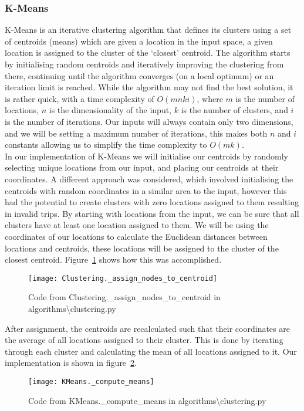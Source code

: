 \subsubsection{K-Means}\label{subsubsec:k-means}
K-Means is an iterative clustering algorithm that defines its clusters using a set of centroids (means) which are
given a location in the input space, a given location is assigned to the cluster of the `closest' centroid.
The algorithm starts by initialising random centroids and iteratively improving the clustering from there, continuing
until the algorithm converges (on a local optimum) or an iteration limit is reached.
While the algorithm may not find the best solution, it is rather quick, with a time complexity of $O(m n k i)$,
where $m$ is the number of locations, $n$ is the dimensionality of the input, $k$ is the number of clusters,
and $i$ is the number of iterations.
Our inputs will always contain only two dimensions, and we will be setting a maximum number of iterations, this
makes both $n$ and $i$ constants allowing us to simplify the time complexity to $O(mk)$.\\

\noindent
In our implementation of K-Means we will initialise our centroids by randomly selecting unique locations from our
input, and placing our centroids at their coordinates.
A different approach was considered, which involved initialising the centroids with random coordinates in a similar
area to the input, however this had the potential to create clusters with zero locations assigned to them resulting
in invalid trips.
By starting with locations from the input, we can be sure that all clusters have at least one location assigned to them.
We will be using the coordinates of our locations to calculate the Euclidean distances between locations and centroids,
these locations will be assigned to the cluster of the closest centroid.
Figure~\ref{fig:Clustering._assign_nodes_to_centroid} shows how this was accomplished.
\begin{figure}[H]
    \centering
    \texttt{[image: Clustering.\_assign\_nodes\_to\_centroid]}
    \caption{Code from Clustering.\_assign\_nodes\_to\_centroid in algorithms\textbackslash clustering.py}\label{fig:Clustering._assign_nodes_to_centroid}
\end{figure}

\noindent
After assignment, the centroids are recalculated such that their coordinates are the average of all locations
assigned to their cluster.
This is done by iterating through each cluster and calculating the mean of all locations assigned to it.
Our implementation is shown in figure~\ref{fig:KMeans._compute_means}.
\begin{figure}[H]
    \centering
    \texttt{[image: KMeans.\_compute\_means]}
    \caption{Code from KMeans.\_compute\_means in algorithms\textbackslash clustering.py}\label{fig:KMeans._compute_means}
\end{figure}

